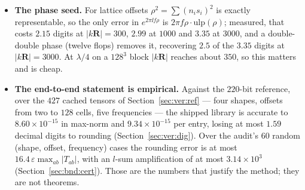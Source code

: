 \begin{itemize}[nosep,leftmargin=1.4em]
The real spherical harmonics from the normalised Legendre recursion have absolute error
never above $6.2\times10^{-15}$ over $l \le 40$ and five directions.
\item \textbf{The phase seed.} For lattice offsets $\rho^2 = \sum(n_is_i)^2$ is exactly
representable, so the only  error in $e^{2\pi\ii f\rho}$ is
$2\pi f\rho\cdot\mathrm{ulp}(\rho)$; measured, that costs $2.15$ digits at
$|k\mathbf{R}| = 300$, $2.99$ at $1000$ and $3.35$ at $3000$, and a double-double phase
(twelve flops) removes it, recovering $2.5$ of the $3.35$ digits at
$|k\mathbf{R}| = 3000$. At $\lambda/4$ on a $128^3$ block $|k\mathbf{R}|$ reaches about
$350$, so this matters and is cheap.
\item \textbf{The end-to-end statement is empirical.} Against the $220$-bit reference, over
the $427$ cached tensors of Section~\ref{sec:ver:ref} --- four shapes, offsets from two to
$128$ cells, five frequencies --- the shipped library is accurate to $8.60\times10^{-15}$ in
max-norm and $9.34\times10^{-15}$ per entry, losing at most $1.59$ decimal digits to
rounding (Section~\ref{sec:ver:dig}). Over the audit's $60$ random (shape, offset,
frequency) cases the rounding error is at most $16.4\,\varepsilon\max_{ab}|T_{ab}|$, with an
$l$-sum amplification of at most $3.14\times10^{3}$ (Section~\ref{sec:bnd:cert}). Those are
the numbers that justify the method; they are not theorems.
\end{itemize}
